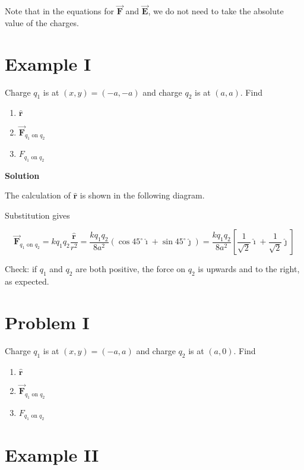 \documentclass{article}
\newcommand{\ihat}[0]{\hat{\boldsymbol{\imath}}}
\newcommand{\jhat}[0]{\hat{\boldsymbol{\jmath}}}
\newcommand{\rhat}[0]{\hat{\mathbf{r}}}
\newcommand{\bfvec}[1]{\vec{\mathbf{#1}}}
\begin{document}
Note that in the equations for $\bfvec{F}$ and $\bfvec{E}$, we do not need to take the absolute value of the charges.

\section{Example I}

Charge $q_1$ is at $(x,y)=(-a,-a)$ and charge $q_2$ is at $(a, a)$. Find

\begin{enumerate}

  \item $\rhat$

  \item $\bfvec{F}_{q_1\text{ on }q_2}$

  \item $F_{q_1\text{ on }q_2}$

\end{enumerate}

\textbf{Solution}

The calculation of $\rhat$ is shown in the following diagram.



Substitution gives

$$\bfvec{F}_{q_1\text{ on }q_2}=kq_1q_2\frac{\rhat}{r^2} = \frac{kq_1q_2}{8a^2}(\cos 45^\circ \ihat + \sin 45^\circ \jhat) =\frac{kq_1q_2}{8a^2}\left[\frac{1}{\sqrt{2}}\ihat + \frac{1}{\sqrt{2}}\jhat\right]$$

Check: if $q_1$ and $q_2$ are both positive, the force on $q_2$ is upwards and to the right, as expected.

\section{Problem I}

Charge $q_1$ is at $(x,y)=(-a,a)$ and charge $q_2$ is at $(a, 0)$. Find

\begin{enumerate}

  \item $\rhat$

  \item $\bfvec{F}_{q_1\text{ on }q_2}$

  \item $F_{q_1\text{ on }q_2}$

\end{enumerate}

\section{Example II}
\end{document}
